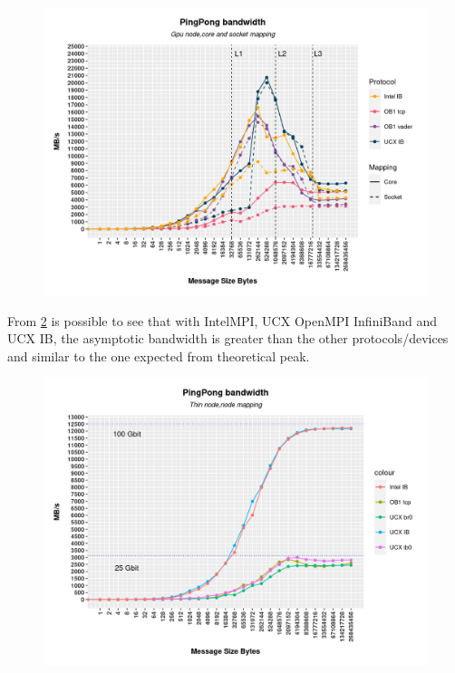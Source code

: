 \documentclass[11pt,a4paper]{article}
\begin{document}
\begin{figure}[h!]
    \centering
    \includegraphics[width=\textwidth]{GpuPingPongBandwidth.png}
    \label{fig:GpuPingPongBandwidth}
\end{figure}
\indent From \ref{fig:ThinNodeMapping} is possible to see that with IntelMPI, UCX OpenMPI InfiniBand and UCX IB, the asymptotic bandwidth is greater than the other protocols/devices and similar to the one expected from theoretical peak.  
\begin{figure}[b!]
    \centering
    \includegraphics[width=\textwidth]{ThinNodeMapping.png}
    \caption{}
    \label{fig:ThinNodeMapping}
\end{figure}
\end{document}
